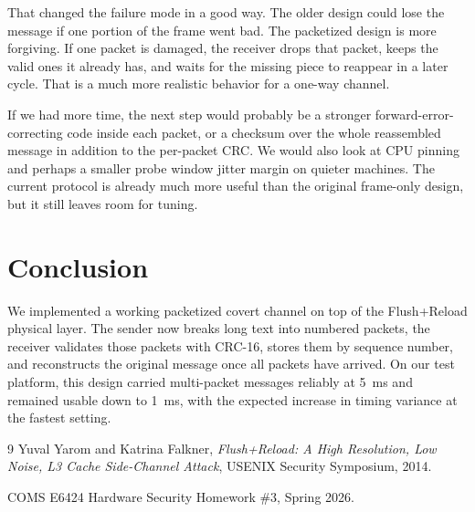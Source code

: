 \documentclass[11pt]{article}
\begin{document}
That changed the failure mode in a good way. The older design could lose the message if one portion of the frame went bad. The packetized design is more forgiving. If one packet is damaged, the receiver drops that packet, keeps the valid ones it already has, and waits for the missing piece to reappear in a later cycle. That is a much more realistic behavior for a one-way channel.

If we had more time, the next step would probably be a stronger forward-error-correcting code inside each packet, or a checksum over the whole reassembled message in addition to the per-packet CRC. We would also look at CPU pinning and perhaps a smaller probe window jitter margin on quieter machines. The current protocol is already much more useful than the original frame-only design, but it still leaves room for tuning.

\section{Conclusion}
We implemented a working packetized covert channel on top of the Flush+Reload physical layer. The sender now breaks long text into numbered packets, the receiver validates those packets with CRC-16, stores them by sequence number, and reconstructs the original message once all packets have arrived. On our test platform, this design carried multi-packet messages reliably at \SI{5}{ms} and remained usable down to \SI{1}{ms}, with the expected increase in timing variance at the fastest setting.

\begin{thebibliography}{9}
Yuval Yarom and Katrina Falkner,
\textit{Flush+Reload: A High Resolution, Low Noise, L3 Cache Side-Channel Attack},
USENIX Security Symposium, 2014.

COMS E6424 Hardware Security Homework \#3, Spring 2026.
\end{thebibliography}
\end{document}
